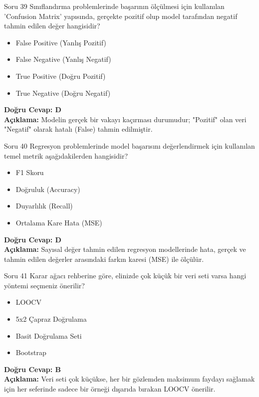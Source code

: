 \documentclass[12pt,a4paper]{article}
\begin{document}
\begin{testcard}{Soru 39}
    Sınıflandırma problemlerinde başarının ölçülmesi için kullanılan 'Confusion Matrix' yapısında, gerçekte pozitif olup model tarafından negatif tahmin edilen değer hangisidir?
    \begin{itemize}
        \item[A)] False Positive (Yanlış Pozitif)
        \item[B)] False Negative (Yanlış Negatif)
        \item[C)] True Positive (Doğru Pozitif)
        \item[D)] True Negative (Doğru Negatif)
    \end{itemize}
    \tcblower
    \textbf{Doğru Cevap: D} \\
    \textbf{Açıklama:} Modelin gerçek bir vakayı kaçırması durumudur; "Pozitif" olan veri "Negatif" olarak hatalı (False) tahmin edilmiştir.
\end{testcard}

\begin{testcard}{Soru 40}
    Regresyon problemlerinde model başarısını değerlendirmek için kullanılan temel metrik aşağıdakilerden hangisidir?
    \begin{itemize}
        \item[A)] F1 Skoru
        \item[B)] Doğruluk (Accuracy)
        \item[C)] Duyarlılık (Recall)
        \item[D)] Ortalama Kare Hata (MSE)
    \end{itemize}
    \tcblower
    \textbf{Doğru Cevap: D} \\
    \textbf{Açıklama:} Sayısal değer tahmin edilen regresyon modellerinde hata, gerçek ve tahmin edilen değerler arasındaki farkın karesi (MSE) ile ölçülür.
\end{testcard}

\begin{testcard}{Soru 41}
    Karar ağacı rehberine göre, elinizde çok küçük bir veri seti varsa hangi yöntemi seçmeniz önerilir?
    \begin{itemize}
        \item[A)] LOOCV
        \item[B)] 5x2 Çapraz Doğrulama
        \item[C)] Basit Doğrulama Seti
        \item[D)] Bootstrap
    \end{itemize}
    \tcblower
    \textbf{Doğru Cevap: B} \\
    \textbf{Açıklama:} Veri seti çok küçükse, her bir gözlemden maksimum faydayı sağlamak için her seferinde sadece bir örneği dışarıda bırakan LOOCV önerilir.
\end{testcard}
\end{document}
